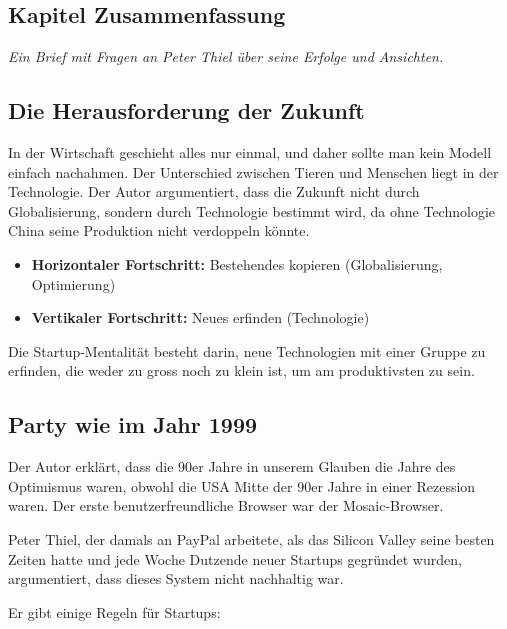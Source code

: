 \documentclass[10pt]{article}
\begin{document}
\clearpage


\begin{center}
\section*{Kapitel Zusammenfassung}
\textit{Ein Brief mit Fragen an Peter Thiel über seine Erfolge und Ansichten.}
\end{center}

\subsection{Die Herausforderung der Zukunft}

In der Wirtschaft geschieht alles nur einmal, und daher sollte man kein Modell einfach nachahmen. Der Unterschied zwischen Tieren und Menschen liegt in der Technologie. Der Autor argumentiert, dass die Zukunft nicht durch Globalisierung, sondern durch Technologie bestimmt wird, da ohne Technologie China seine Produktion nicht verdoppeln könnte.

\begin{itemize}
\item\textbf{Horizontaler Fortschritt:} Bestehendes kopieren (Globalisierung, Optimierung)
\item\textbf{Vertikaler Fortschritt:} Neues erfinden (Technologie)
\end{itemize}

Die Startup-Mentalität besteht darin, neue Technologien mit einer Gruppe zu erfinden, die weder zu gross noch zu klein ist, um am produktivsten zu sein.

\subsection{Party wie im Jahr 1999}

Der Autor erklärt, dass die 90er Jahre in unserem Glauben die Jahre des Optimismus waren, obwohl die USA Mitte der 90er Jahre in einer Rezession waren. Der erste benutzerfreundliche Browser war der Mosaic-Browser.

Peter Thiel, der damals an PayPal arbeitete, als das Silicon Valley seine besten Zeiten hatte und jede Woche Dutzende neuer Startups gegründet wurden, argumentiert, dass dieses System nicht nachhaltig war.

Er gibt einige Regeln für Startups:
\end{document}
